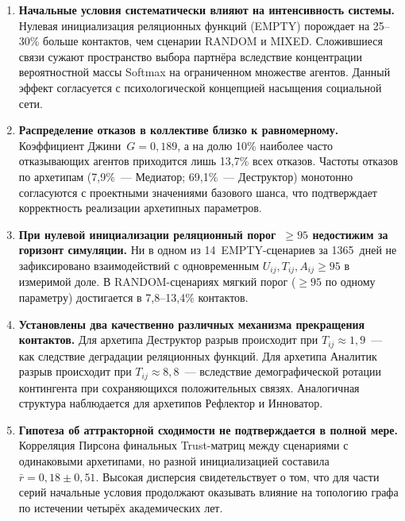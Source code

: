 \documentclass[12pt]{article}
\begin{document}
\begin{enumerate}

    \item \textbf{Начальные условия систематически влияют на интенсивность
          системы.}
          Нулевая инициализация реляционных функций (EMPTY) порождает на
          25--30\% больше контактов, чем сценарии RANDOM и MIXED.
          Сложившиеся связи сужают пространство выбора партнёра
          вследствие концентрации вероятностной массы Softmax на
          ограниченном множестве агентов.
          Данный эффект согласуется с психологической концепцией
          насыщения социальной сети.

    \item \textbf{Распределение отказов в коллективе близко к равномерному.}
          Коэффициент Джини~$G = 0{,}189$, а на долю 10\% наиболее
          часто отказывающих агентов приходится лишь 13,7\% всех
          отказов. Частоты отказов по архетипам (7,9\%~--- Медиатор;
          69,1\%~--- Деструктор) монотонно согласуются с
          проектными значениями базового шанса, что подтверждает
          корректность реализации архетипных параметров.

    \item \textbf{При нулевой инициализации реляционный порог~$\ge 95$
          недостижим за горизонт симуляции.}
          Ни в одном из 14~EMPTY-сценариев за 1365~дней не
          зафиксировано взаимодействий с одновременным
          $U_{ij},T_{ij},A_{ij} \ge 95$ в измеримой доле.
          В RANDOM-сценариях мягкий порог ($\ge 95$ по одному
          параметру) достигается в 7,8--13,4\% контактов.

    \item \textbf{Установлены два качественно различных механизма
          прекращения контактов.}
          Для архетипа Деструктор разрыв происходит при
          $T_{ij} \approx 1{,}9$~--- как следствие деградации
          реляционных функций.
          Для архетипа Аналитик разрыв происходит при
          $T_{ij} \approx 8{,}8$~--- вследствие демографической
          ротации контингента при сохраняющихся положительных связях.
          Аналогичная структура наблюдается для архетипов Рефлектор
          и Инноватор.

    \item \textbf{Гипотеза об аттракторной сходимости не подтверждается
          в полной мере.}
          Корреляция Пирсона финальных Trust-матриц между сценариями
          с одинаковыми архетипами, но разной инициализацией
          составила~$\bar{r} = 0{,}18 \pm 0{,}51$.
          Высокая дисперсия свидетельствует о том, что для части
          серий начальные условия продолжают оказывать влияние
          на топологию графа по истечении четырёх академических лет.


\end{enumerate}
\end{document}
